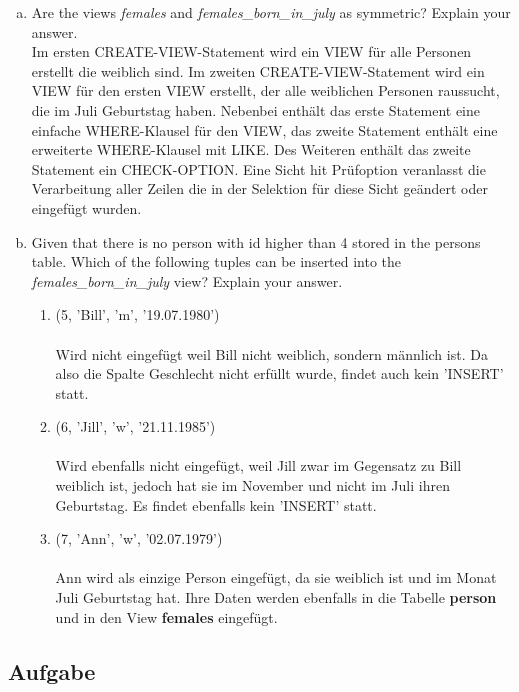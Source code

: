 \documentclass[11pt,a4paper,DIV=9]{scrartcl}
\newcounter{temp}
\newcommand{\aufgabe}[1]{
  \setcounter{temp}{\value{subsection}}
  \setcounter{subsection}{#1}
  \addtocounter{subsection}{-1}
  \subsection{Aufgabe}
  \setcounter{subsection}{\value{temp}}
}
\begin{document}
  \begin{enumerate}[a.]
  \item Are the views \textit{females} and \textit{females\_born\_in\_july} as symmetric? Explain your answer. \\
  Im ersten CREATE-VIEW-Statement wird ein VIEW f\"ur alle Personen erstellt die weiblich sind.
  Im zweiten CREATE-VIEW-Statement wird ein VIEW f\"ur den ersten VIEW erstellt, der alle weiblichen Personen raussucht, die im Juli Geburtstag haben. Nebenbei enth\"alt das erste Statement eine einfache WHERE-Klausel f\"ur den VIEW, das zweite Statement enth\"alt eine erweiterte WHERE-Klausel mit LIKE. Des Weiteren enth\"alt das zweite Statement ein CHECK-OPTION. Eine Sicht hit Pr\"ufoption veranlasst die Verarbeitung aller Zeilen die in der Selektion f\"ur diese Sicht ge\"andert oder eingef\"ugt wurden.  \item Given that there is no person with id higher than 4 stored in the persons table. Which of the following tuples can be inserted into the \textit{females\_born\_in\_july} view? Explain your answer.
  \begin{enumerate}[1.]  %
  \item (5, 'Bill', 'm', '19.07.1980')
  \\\\Wird nicht eingef\"ugt weil Bill nicht weiblich, sondern m\"annlich ist. Da also die Spalte Geschlecht nicht erf\"ullt wurde, findet auch kein 'INSERT' statt.
  \item (6, 'Jill', 'w', '21.11.1985')
  \\\\Wird ebenfalls nicht eingef\"ugt, weil Jill zwar im Gegensatz zu Bill weiblich ist, jedoch hat sie im November und nicht im Juli ihren Geburtstag. Es findet ebenfalls kein 'INSERT' statt.
  \item (7, 'Ann', 'w', '02.07.1979')
  \\\\Ann wird als einzige Person eingef\"ugt, da sie weiblich ist und im Monat Juli Geburtstag hat. Ihre Daten werden ebenfalls in die Tabelle \textbf{person} und in den View \textbf{females} eingef\"ugt.
  \end{enumerate}
  \end{enumerate}
  \aufgabe{3}
\end{document}
